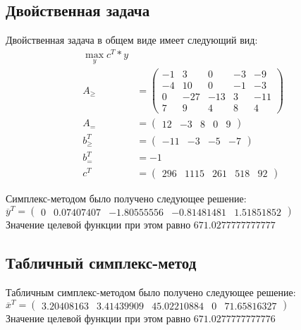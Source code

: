 \subsection{Двойственная задача}
Двойственная задача в общем виде имеет следующий вид:
\begin{align*} 
	\max_y c^T \ast y \\
	A_{\geq}&=
		\begin{pmatrix} 
			-1 & 3 & 0 & -3 & -9 \\ 
			-4 & 10 & 0 & -1 & -3 \\ 
			0 & -27 & -13 & 3 & -11 \\ 
			7 & 9 & 4 & 8 & 4
		\end{pmatrix}\\
	A_{=}&=
		\begin{pmatrix} 
			12 & -3 & 8 & 0 & 9
		\end{pmatrix}\\
	b_{\geq}^T&=
		\begin{pmatrix} 
			-11 & 
			 -3 & 
			 -5 & 
			 -7
		\end{pmatrix} \\
	b_{=}^T&= -1\\
	c^T&=
		\begin{pmatrix} 
			 296 & 1115 & 261 & 518 &  92
		\end{pmatrix}		
\end{align*} 

Симплекс-методом было получено следующее решение:\\
$\overline{y}^T=
	\begin{pmatrix} 
		 0 & 0.07407407 & -1.80555556 & -0.81481481 & 1.51851852
	\end{pmatrix}$\\
Значение целевой функции при этом равно $671.0277777777777$

\subsection{Табличный симплекс-метод}
Табличным симплекс-методом было получено следующее решение:\\
$\overline{x}^T=
	\begin{pmatrix} 
		 3.20408163 &
		 3.41439909 &
		 45.02210884 & 
		 0 &
		 71.65816327
	\end{pmatrix}$\\
Значение целевой функции при этом равно $671.0277777777776$

